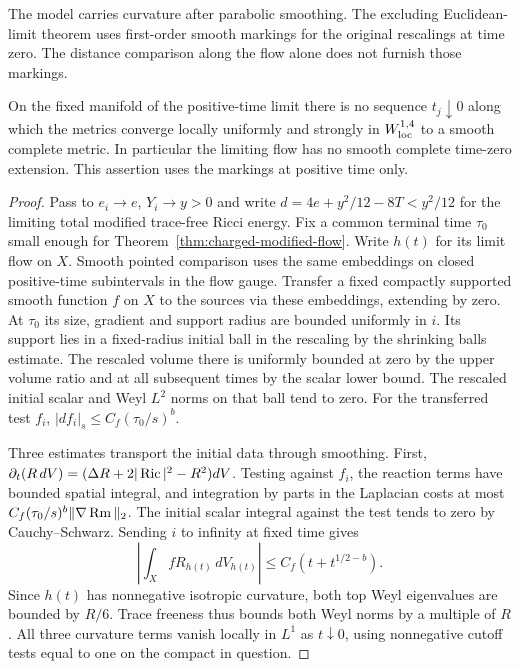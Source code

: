 The model carries curvature after parabolic smoothing. The excluding
Euclidean-limit theorem uses first-order smooth markings for the
original rescalings at time zero. The distance comparison along the
flow alone does not furnish those markings.

\begin{corollary}
\label{cor:charged-flow-initial-end}
On the fixed manifold of the positive-time limit there is no sequence
\(t_j\downarrow0\) along which the metrics converge locally uniformly
and strongly in \(W^{1,4}_{\rm loc}\) to a smooth complete metric.
In particular the limiting flow has no smooth complete time-zero
extension. This assertion uses the markings at positive time only.
\end{corollary}

\begin{proof}
Pass to \(e_i\to e\), \(Y_i\to y>0\) and write
\(d=4e+y^2/12-8T<y^2/12\) for the limiting total modified
trace-free Ricci energy. Fix a common terminal time \(\tau_0\) small
enough for Theorem~\ref{thm:charged-modified-flow}. Write \(h(t)\)
for its limit flow on \(X\). Smooth pointed comparison uses the same
embeddings on closed positive-time subintervals in the flow gauge.
Transfer a fixed compactly supported smooth function \(f\) on \(X\)
to the sources via these embeddings, extending by zero. At \(\tau_0\)
its size, gradient and support radius are bounded uniformly in \(i\).
Its support lies in a fixed-radius initial ball in the rescaling by
the shrinking balls estimate. The rescaled volume there is uniformly
bounded at zero by the upper volume ratio and at all subsequent times
by the scalar lower bound. The rescaled initial scalar and Weyl
\(L^2\) norms on that ball tend to zero. For the transferred test
\(f_i\), \(|df_i|_s\le C_f (\tau_0/s)^b\).

Three estimates transport the initial data through smoothing. First,
\(\partial_t(R\,dV)=(\Delta R+2|\operatorname{Ric}|^2-R^2)dV\).
Testing against \(f_i\), the reaction terms have bounded spatial
integral, and integration by parts in the Laplacian costs at most
\(C_f(\tau_0/s)^b\|\nabla\operatorname{Rm}\|_2\). The initial scalar integral
against the test tends to zero by Cauchy--Schwarz. Sending \(i\) to
infinity at fixed time gives
\[
 \left|\int_X fR_{h(t)}\,dV_{h(t)}\right|
       \le C_f(t+t^{1/2-b}).
\]
Since \(h(t)\) has nonnegative isotropic curvature, both top Weyl
eigenvalues are bounded by \(R/6\). Trace freeness thus bounds both
Weyl norms by a multiple of \(R\). All three curvature terms vanish
locally in \(L^1\) as \(t\downarrow0\), using nonnegative cutoff
tests equal to one on the compact in question.


\end{proof}
